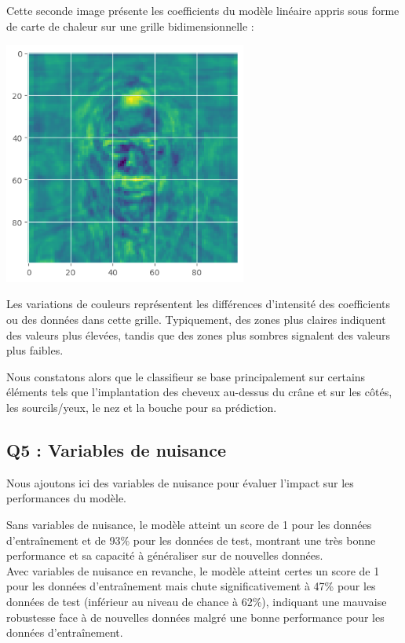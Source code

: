 \documentclass{scrartcl}
\begin{document}
Cette seconde image présente les coefficients du modèle linéaire appris sous forme de carte de chaleur sur une grille bidimensionnelle :

\begin{center}
    \includegraphics[width=0.6\textwidth]{../images/cc.png}
\end{center}

Les variations de couleurs représentent les différences d'intensité des coefficients ou des données dans cette grille. Typiquement, des zones plus claires indiquent des valeurs plus élevées, tandis que des zones plus sombres signalent des valeurs plus faibles.\newline

Nous constatons alors que le classifieur se base principalement sur certains éléments tels que l'implantation des cheveux au-dessus du crâne et sur les côtés, les sourcils/yeux, le nez et la bouche pour sa prédiction.

\subsection{Q5 : Variables de nuisance}
\hspace{7pt} Nous ajoutons ici des variables de nuisance pour évaluer l'impact sur les performances du modèle.\newline

Sans variables de nuisance, le modèle atteint un score de 1 pour les données d'entraînement et de 93\% pour les données de test, montrant une très bonne performance et sa capacité à généraliser sur de nouvelles données.\\
Avec variables de nuisance en revanche, le modèle atteint certes un score de 1 pour les données d'entraînement mais chute significativement à 47\% pour les données de test (inférieur au niveau de chance à 62\%), indiquant une mauvaise robustesse face à de nouvelles données malgré une bonne performance pour les données d'entraînement.
\end{document}
